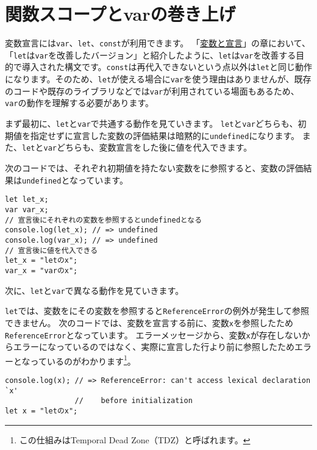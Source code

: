 \hypertarget{hoisting-var}{%
\section{関数スコープとvarの巻き上げ}\label{hoisting-var}}

変数宣言には\texttt{var}、\texttt{let}、\texttt{const}が利用できます。
「\hyperlink{variable-and-declaration}{変数と宣言}」の章において、「\texttt{let}は\texttt{var}を改善したバージョン」と紹介したように、\texttt{let}は\texttt{var}を改善する目的で導入された構文です。\texttt{const}は再代入できないという点以外は\texttt{let}と同じ動作になります。そのため、\texttt{let}が使える場合に\texttt{var}を使う理由はありませんが、既存のコードや既存のライブラリなどでは\texttt{var}が利用されている場面もあるため、\texttt{var}の動作を理解する必要があります。

まず最初に、\texttt{let}と\texttt{var}で共通する動作を見ていきます。
\texttt{let}と\texttt{var}どちらも、初期値を指定せずに宣言した変数の評価結果は暗黙的に\texttt{undefined}になります。
また、\texttt{let}と\texttt{var}どちらも、変数宣言をした後に値を代入できます。

次のコードでは、それぞれ初期値を持たない変数を\textbf{}に参照すると、変数の評価結果は\texttt{undefined}となっています。

\begin{lstlisting}
let let_x;
var var_x;
// 宣言後にそれぞれの変数を参照するとundefinedとなる
console.log(let_x); // => undefined
console.log(var_x); // => undefined
// 宣言後に値を代入できる
let_x = "letのx";
var_x = "varのx";
\end{lstlisting}

次に、\texttt{let}と\texttt{var}で異なる動作を見ていきます。

\texttt{let}では、変数を\textbf{}にその変数を参照すると\texttt{ReferenceError}の例外が発生して参照できません。
次のコードでは、変数を宣言する前に、変数\texttt{x}を参照したため\texttt{ReferenceError}となっています。
エラーメッセージから、変数\texttt{x}が存在しないからエラーになっているのではなく、実際に宣言した行より前に参照したためエラーとなっているのがわかります\footnote{この仕組みはTemporal
  Dead Zone（TDZ）と呼ばれます。}。

\begin{lstlisting}
console.log(x); // => ReferenceError: can't access lexical declaration `x' 
                //    before initialization
let x = "letのx";
\end{lstlisting}

